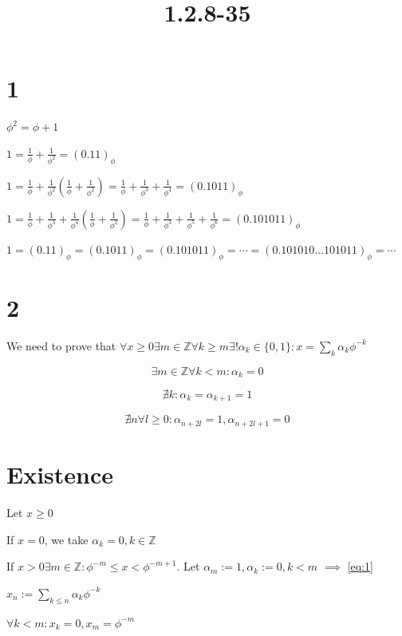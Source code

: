\documentclass{article}
\title{1.2.8-35}
\begin{document}
\maketitle

\section*{1}

\( \phi^2 = \phi + 1 \)

\( 1 = \frac{1}{\phi} + \frac{1}{\phi^2} = (0.11)_\phi \)

\( 1 = \frac{1}{\phi} + \frac{1}{\phi^2}(\frac{1}{\phi} + \frac{1}{\phi^2}) = \frac{1}{\phi} + \frac{1}{\phi^3} + \frac{1}{\phi^4} = (0.1011)_\phi \)

\( 1 = \frac{1}{\phi} + \frac{1}{\phi^3} + \frac{1}{\phi^4}(\frac{1}{\phi} + \frac{1}{\phi^2}) = \frac{1}{\phi} + \frac{1}{\phi^3} + \frac{1}{\phi^5} + \frac{1}{\phi^6} = (0.101011)_\phi \)

\( 1 = (0.11)_\phi = (0.1011)_\phi = (0.101011)_\phi = \cdots = (0.101010\ldots 101011)_\phi = \cdots \)

\section*{2}

We need to prove that \( \forall x \geq 0 \exists m \in \mathbb{Z} \forall k \geq m \exists! \alpha_k \in \{ 0, 1 \}: x = \sum_{k}\alpha_k \phi^{-k} \)

\[\exists m \in \mathbb{Z} \forall k < m: \alpha_k = 0 \tag{1}\label{eq:1}\]

\[\nexists k: \alpha_k=\alpha_{k+1} = 1 \tag{2}\label{eq:2}\]

\[\nexists n \forall l\geq 0: \alpha_{n+2l} = 1, \alpha_{n+2l + 1} = 0 \tag{3}\label{eq:3}\]

\section*{Existence}

Let \( x \geq 0 \)

If \( x = 0 \), we take \( \alpha_k = 0, k \in \mathbb{Z} \)

If \( x > 0 \exists m \in \mathbb{Z}: \phi^{-m} \leq x < \phi^{-m + 1} \). Let \( \alpha_m := 1, \alpha_k := 0, k < m \) \( \implies \) \eqref{eq:1}

\( x_n := \sum_{k \leq n} \alpha_k \phi^{-k} \)

\( \forall k<m: x_k=0, x_m = \phi^{-m} \)
\end{document}
